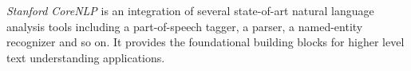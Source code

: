 {%
%
%
%
%
%
%

%
\emph{Stanford CoreNLP} is an integration of
several state-of-art natural language analysis tools
including a part-of-speech tagger\cite{toutanova2003feature},
a parser\cite{StanfordParser},
a named-entity recognizer \cite{finkel2005incorporating} and so on.
It provides the foundational building blocks for higher level text understanding applications.
}%



